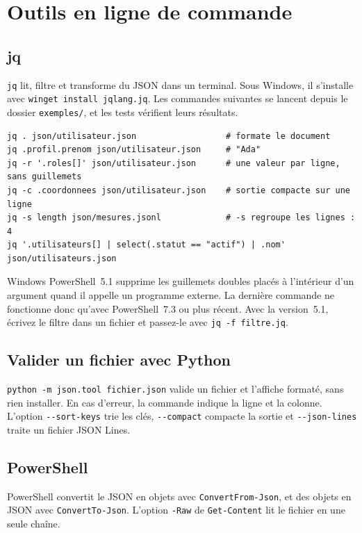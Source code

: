 \documentclass[12pt,a4paper]{article}
\begin{document}
\section{Outils en ligne de commande}
\label{sec:outils}

\subsection{jq}
\texttt{jq} lit, filtre et transforme du JSON dans un terminal. Sous Windows, il s'installe avec \texttt{winget install jqlang.jq}. Les commandes suivantes se lancent depuis le dossier \texttt{exemples/}, et les tests vérifient leurs résultats.

\begin{lstlisting}[caption={Commandes jq courantes}]
jq . json/utilisateur.json                  # formate le document
jq .profil.prenom json/utilisateur.json     # "Ada"
jq -r '.roles[]' json/utilisateur.json      # une valeur par ligne, sans guillemets
jq -c .coordonnees json/utilisateur.json    # sortie compacte sur une ligne
jq -s length json/mesures.jsonl             # -s regroupe les lignes : 4
jq '.utilisateurs[] | select(.statut == "actif") | .nom' json/utilisateurs.json
\end{lstlisting}

Windows PowerShell~5.1 supprime les guillemets doubles placés à l'intérieur d'un argument quand il appelle un programme externe. La dernière commande ne fonctionne donc qu'avec PowerShell~7.3 ou plus récent. Avec la version~5.1, écrivez le filtre dans un fichier et passez-le avec \texttt{jq -f filtre.jq}.

\subsection{Valider un fichier avec Python}
\texttt{python -m json.tool fichier.json} valide un fichier et l'affiche formaté, sans rien installer. En cas d'erreur, la commande indique la ligne et la colonne. L'option \texttt{-{}-sort-keys} trie les clés, \texttt{-{}-compact} compacte la sortie et \texttt{-{}-json-lines} traite un fichier JSON Lines.

\subsection{PowerShell}
PowerShell convertit le JSON en objets avec \texttt{ConvertFrom-Json}, et des objets en JSON avec \texttt{ConvertTo-Json}. L'option \texttt{-Raw} de \texttt{Get-Content} lit le fichier en une seule chaîne.
\end{document}
